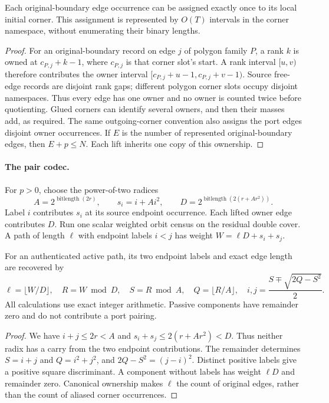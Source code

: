 \begin{proposition}
Each original-boundary edge occurrence can be assigned exactly once to its
local initial corner. This assignment is represented by $O(T)$ intervals
in the corner namespace, without enumerating their binary lengths.
\end{proposition}
\begin{proof}
For an original-boundary record on edge $j$ of polygon family $P$, a rank
$k$ is owned at $c_{P,j}+k-1$, where $c_{P,j}$ is that corner slot's start.
A rank interval $[u,v)$ therefore contributes the owner interval
$[c_{P,j}+u-1,c_{P,j}+v-1)$. Source free-edge records are disjoint rank gaps;
different polygon corner slots occupy disjoint namespaces. Thus every edge
has one owner and no owner is counted twice before quotienting. Glued
corners can identify several owners, and then their masses add, as required.
The same outgoing-corner convention also assigns the port edges disjoint
owner occurrences. If $E$ is the number of represented original-boundary
edges, then $E+p\le N$. Each lift inherits one copy of this ownership.
\end{proof}

\paragraph{The pair codec.}
For $p>0$, choose the power-of-two radices
\[
 A=2^{\operatorname{bitlength}(2r)},\qquad
 s_i=i+A i^2,\qquad
 D=2^{\operatorname{bitlength}(2(r+A r^2))}.
\]
Label $i$ contributes $s_i$ at its source endpoint occurrence. Each lifted
owner edge contributes $D$. Run one scalar weighted orbit census on the
residual double cover. A path of length $\ell$ with endpoint labels $i<j$
has weight $W=\ell D+s_i+s_j$.

\begin{proposition}
For an authenticated active path, its two endpoint labels and exact edge
length are recovered by
\[
 \ell=\lfloor W/D\rfloor,\quad R=W\bmod D,\quad
 S=R\bmod A,\quad Q=\lfloor R/A\rfloor,\quad
 i,j=\frac{S\mp\sqrt{2Q-S^2}}2.
\]
All calculations use exact integer arithmetic. Passive components have
remainder zero and do not contribute a port pairing.
\end{proposition}
\begin{proof}
We have $i+j\le2r<A$ and $s_i+s_j\le2(r+A r^2)<D$. Thus neither radix has a
carry from the two endpoint contributions. The remainder determines
$S=i+j$ and $Q=i^2+j^2$, and $2Q-S^2=(j-i)^2$. Distinct positive labels give
a positive square discriminant. A component without labels has weight
$\ell D$ and remainder zero. Canonical ownership makes $\ell$ the count of
original edges, rather than the count of aliased corner occurrences.
\end{proof}

